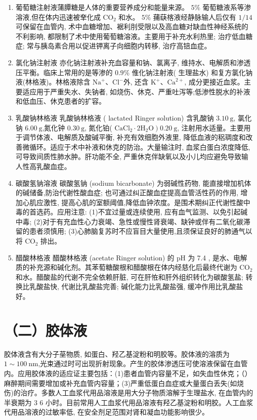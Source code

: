 \documentclass[10pt]{article}
\begin{document}
\begin{enumerate}
  \item 葡萄糖注射液蒲䐺糖是人体的重要营养成分和能量来源。 $5 \%$ 葡萄糖液系等渗溶液,但在体内迅速被羍化成 $\mathrm{CO}_{2}$ 和水。 $5 \%$ 蒱蒛楁液经静脉输人后仅有 $1 / 14$ 可保留在血管内, 术中血糖增加、裾利刖受限以及高血糖对缺血性神经系统的不利影响, 都限制了术中使用葡萄糖溶液。主要用于补充水利热里; 治疗低血糖症; 常与胰岛素合用以促进钾离子向细胞内转移, 治疗高锫血症。

  \item 氯化钠注射液 亦化钠注射液补充血容量和钠、氯离子, 维持水、电解质和渗透压平衡。临床上常用的是等渗的 $0.9 \%$ 倠化钠注射液( 生理盐水) 和复方氯化钠液(林格液)。林格液除含 $\mathrm{Na}^{+} 、 \mathrm{Cl}^{-}$外, 还含 $\mathrm{K}^{+} 、 \mathrm{Ca}^{2+}$, 成分更接近血浆。主要适应用于严重失水、失钠者, 如烧伤、休克、严重吐泻等;低渗性脱水的补液和低血压、休克患者的扩容。

  \item 乳酸钠林格液 乳酸钠林格液 ( lactated Ringer solution) 含乳酸钠 $3.10 \mathrm{~g}$, 氯化钠 $6.00 \mathrm{~g}$,氮化钟 $0.30 \mathrm{~g}$, 氮化铂( $\left.\mathrm{CaCl}_{2} \cdot 2 \mathrm{H}_{2} \mathrm{O}\right) 0.20 \mathrm{~g}$, 注射用水适量。主要用于调节体液、电解质及酸碱平衡, 补充有效细胞外液里, 降低血液的稆琱度和改善微循环。适应于术中补液和休克的防治。大量输注时, 血浆白蛋白浓度降低, 可导致间质性肺水肿。肝功能不全, 严重休克伴缺氧以及小儿均应避免导致输人性高乳酸血症。

  \item 碳酸氢钠溶液 碳酸氢钠 (sodium bicarbonate) 为弱碱性药物, 能直接增加机体的碱储备,防治代谢性酸血症; 也可通过纠正酸血症提高血管活性药的作用, 增加心肌应激性, 提高心肌的室额阈值,降低血钟浓度。是围术期纠正代谢性酸中毒的首选药。应用注意: (1)不宜过量或连续使用, 应有血气监测、以免引起碱中毒; (2)对于有充血性心力衰竭、急性或慢性肾衰竭、缺钟或伴有二氧化碳滞留的患者须慎用; (3)心肺脑复苏时不应盲目大量使用,且须保证良好的肺通气以将 $\mathrm{CO}_{2}$ 排出。

  \item 醋酸林格液 醋酸林格液 (acetate Ringer solution) 的 $\mathrm{pH}$ 为 7.4 , 是水、电解质的补充源和碱化剂。其苯萄糖酸根和醋酸根在体内经慈化后最终代谢为 $\mathrm{CO}_{2}$ 和水。醋酸盐的代谢不完全依赖肝脏, 可在肝恠和肝外组织转化为碳酸氢盐; 转换比乳酸盐快, 代谢比乳酸盐完善; 碱化能力比乳酸盐强, 缓冲作用比乳酸盐好。

\end{enumerate}

\section*{（二）胶体液}
胶体液含有大分子莝物质, 如蛋白、羟乙基淀粉和明胶等。胶体液的溶质为 $1 \sim 100 \mathrm{~nm}$,光束通过时可出现折射现象。产生的胶体渗透压可使溶液保留在血管内。应用胶体液的适应证主要包括：(1)患者血管内容量不足，如失血性休克；（）麻醉期间需要增加或补充血管内容量；(3)严重低蛋白血症或大量蛋白丢失(如烧伤)的治疗。多数人工血浆代用品溶液是用大分子物质溶解于生理盐水, 在血管内的半衰期为 3 6 小时。目前常用人工血浆代用品溶液有羟乙基淀粉和明胶。人工血浆代用品溶液的过敏率低, 在安全剂足范围对肾和凝血功能影响很少。
\end{document}
